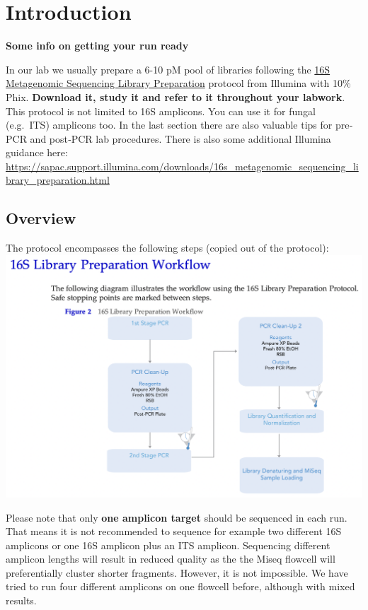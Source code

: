\documentclass[
]{book}
\begin{document}
\hypertarget{introduction}{%
\section{Introduction}\label{introduction}}

\textbf{Some info on getting your run ready}

In our lab we usually prepare a 6-10 pM pool of libraries following the \href{https://sapac.support.illumina.com/content/dam/illumina-support/documents/documentation/chemistry_documentation/16s/16s-metagenomic-library-prep-guide-15044223-b.pdf}{16S Metagenomic Sequencing Library
Preparation} protocol from Illumina with 10\% Phix. \textbf{Download it, study it and refer to it throughout your labwork}. This protocol is not limited to 16S amplicons. You can use it for fungal (e.g.~ITS) amplicons too. In the last section there are also valuable tips for pre‐PCR and post‐PCR lab procedures. There is also some additional Illumina guidance here: \url{https://sapac.support.illumina.com/downloads/16s_metagenomic_sequencing_library_preparation.html}

\hypertarget{overview}{%
\subsection{Overview}\label{overview}}

The protocol encompasses the following steps (copied out of the protocol):
\includegraphics{./img/16Slibraryprotocolworkflow.png}

Please note that only \textbf{one amplicon target} should be sequenced in each run. That means it is not recommended to sequence for example two different 16S amplicons or one 16S amplicon plus an ITS amplicon. Sequencing different amplicon lengths will result in reduced quality as the the Miseq flowcell will preferentially cluster shorter fragments. However, it is not impossible. We have tried to run four different amplicons on one flowcell before, although with mixed results.
\end{document}
